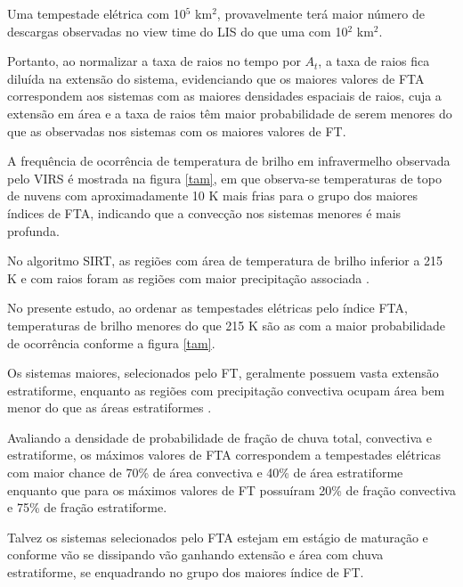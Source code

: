 Uma tempestade elétrica com 10$^5$ km$^2$, provavelmente terá maior número de descargas observadas no view time do LIS do que uma com 10$^2$ km$^2$. 


Portanto, ao normalizar a taxa de raios no tempo por $A_t$, a taxa de raios fica diluída na extensão do sistema, evidenciando que os maiores valores de FTA correspondem aos sistemas com as maiores densidades espaciais de raios, cuja a extensão em área e a taxa de raios têm maior probabilidade de serem menores do que as observadas nos sistemas com os maiores valores de FT.

A frequência de ocorrência de temperatura de brilho em infravermelho observada pelo VIRS é mostrada na figura \ref{tam}, em que observa-se temperaturas de topo de nuvens com aproximadamente 10 K mais frias para o grupo dos maiores índices de FTA, indicando que a convecção nos sistemas menores é mais profunda. 

No algoritmo SIRT, as regiões com área de temperatura de brilho inferior a 215 K e com raios foram as regiões com maior precipitação associada \cite{moralesSIRT}.

No presente estudo, ao ordenar as tempestades elétricas pelo índice FTA, temperaturas de brilho menores do que 215 K são as com a maior probabilidade de ocorrência conforme a figura \ref{tam}.

Os sistemas maiores, selecionados pelo FT, geralmente possuem vasta extensão estratiforme, enquanto as regiões com precipitação convectiva ocupam área bem menor do que as áreas estratiformes \cite{HouzeJr2007, Rasmussen2011}.

Avaliando a densidade de probabilidade de fração de chuva total, convectiva e estratiforme, os máximos valores de FTA correspondem a tempestades elétricas com maior chance de 70\% de área convectiva e 40\% de área estratiforme enquanto que para os máximos valores de FT possuíram 20\% de fração convectiva e 75\% de fração estratiforme.


Talvez os sistemas selecionados pelo FTA estejam em estágio de maturação e conforme vão se dissipando vão ganhando extensão e área com chuva estratiforme, se enquadrando no grupo dos maiores índice de FT. 


